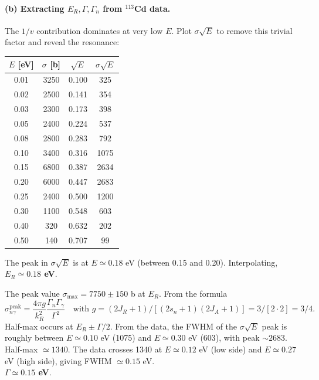 \documentclass[11pt]{article}
\begin{document}
\paragraph{(b) Extracting $E_R,\Gamma,\Gamma_n$ from $^{113}$Cd data.}

The $1/v$ contribution dominates at very low $E$. Plot $\sigma\sqrt E$ to remove this trivial factor and reveal the resonance:

\begin{center}
\begin{tabular}{@{}cccc@{}}\hline
$E$ [eV] & $\sigma$ [b] & $\sqrt E$ & $\sigma\sqrt E$\\\hline
0.01 & 3250 & 0.100 & 325\\
0.02 & 2500 & 0.141 & 354\\
0.03 & 2300 & 0.173 & 398\\
0.05 & 2400 & 0.224 & 537\\
0.08 & 2800 & 0.283 & 792\\
0.10 & 3400 & 0.316 & 1075\\
0.15 & 6800 & 0.387 & 2634\\
0.20 & 6000 & 0.447 & 2683\\
0.25 & 2400 & 0.500 & 1200\\
0.30 & 1100 & 0.548 & 603\\
0.40 & 320 & 0.632 & 202\\
0.50 & 140 & 0.707 & 99\\\hline
\end{tabular}
\end{center}

\begin{center}
\end{center}

The peak in $\sigma\sqrt E$ is at $E\simeq 0.18$ eV (between 0.15 and 0.20). Interpolating, \textbf{$E_R\simeq 0.18$ eV}.

The peak value $\sigma_\mathrm{max}=7750\pm 150$ b at $E_R$. From the formula
\[
\sigma_{n\gamma}^\mathrm{peak}=\frac{4\pi g}{k^{2}_R}\frac{\Gamma_n\Gamma_\gamma}{\Gamma^{2}}\quad\text{with }g=(2J_R+1)/[(2s_n+1)(2J_A+1)]=3/[2\cdot 2]=3/4.
\]
Half-max occurs at $E_R\pm\Gamma/2$. From the data, the FWHM of the $\sigma\sqrt E$ peak is roughly between $E\simeq 0.10$ eV (1075) and $E\simeq 0.30$ eV (603), with peak $\sim 2683$. Half-max $\simeq 1340$. The data crosses 1340 at $E\simeq 0.12$ eV (low side) and $E\simeq 0.27$ eV (high side), giving FWHM $\simeq 0.15$ eV.\\
\textbf{$\Gamma\simeq 0.15$ eV}.
\end{document}
